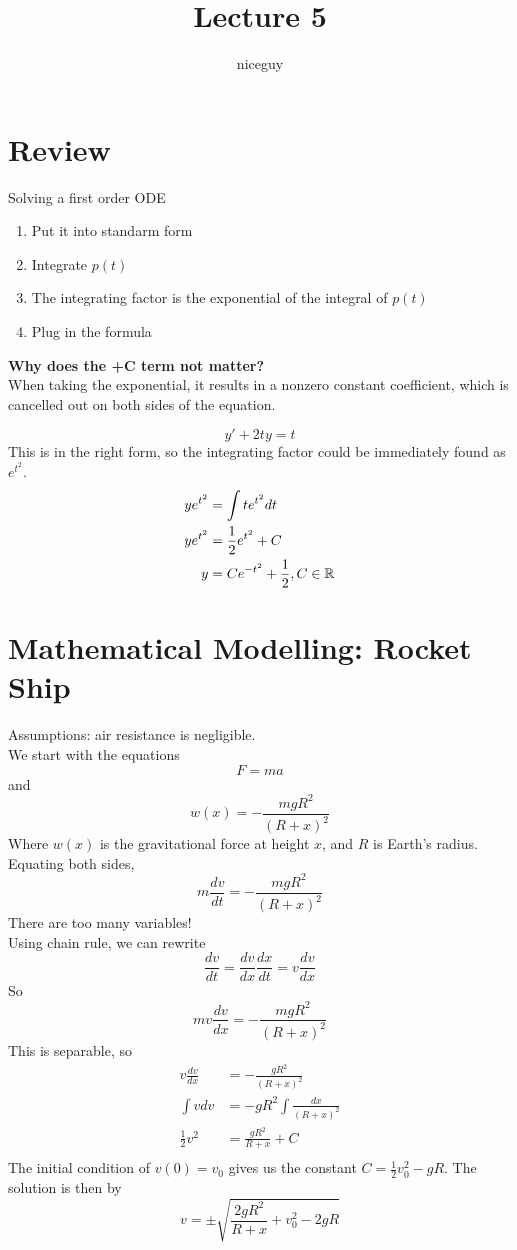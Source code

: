 \documentclass[12pt]{article}
\author{niceguy}
\title{Lecture 5}
\begin{document}
\maketitle

\section{Review}
Solving a first order ODE
\begin{enumerate}
	\item Put it into standarm form \\
	\item Integrate $p(t)$ \\
	\item The integrating factor is the exponential of the integral of $p(t)$ \\
	\item Plug in the formula \\
\end{enumerate}

\textbf{Why does the +C term not matter?} \\
When taking the exponential, it results in a nonzero constant coefficient, which is cancelled out on both sides of the equation.

\begin{ex}
	$$y' + 2ty = t$$
	This is in the right form, so the integrating factor could be immediately found as $e^{t^2}$.
	\begin{align*}
		ye^{t^2} &= \int te^{t^2} dt \\
		ye^{t^2} &= \frac{1}{2} e^{t^2} + C \\
		y &= Ce^{-t^2} + \frac{1}{2}, C \in \mathbb{R} \\
	\end{align*}
\end{ex}

\section{Mathematical Modelling: Rocket Ship}
Assumptions: air resistance is negligible. \\
We start with the equations
$$F = ma$$
and
$$w(x) = -\frac{mgR^2}{(R+x)^2}$$
Where $w(x)$ is the gravitational force at height $x$, and $R$ is Earth's radius. \\
Equating both sides,
$$m\frac{dv}{dt} = -\frac{mgR^2}{(R+x)^2}$$
There are too many variables! \\
Using chain rule, we can rewrite
$$\frac{dv}{dt} = \frac{dv}{dx} \frac{dx}{dt} = v \frac{dv}{dx}$$
So
$$mv \frac{dv}{dx} = -\frac{mgR^2}{(R+x)^2}$$
This is separable, so
\begin{align*}
	v \frac{dv}{dx} &= -\frac{gR^2}{(R+x)^2} \\
	\int vdv &= -gR^2 \int \frac{dx}{(R+x)^2} \\
	\frac{1}{2} v^2 &= \frac{gR^2}{R+x} + C \\
\end{align*}
The initial condition of $v(0) = v_0$ gives us the constant $C = \frac{1}{2} v_0^2 - gR$. The solution is then by
$$v = \pm \sqrt{\frac{2gR^2}{R+x} + v_0^2 - 2gR}$$
\end{document}
